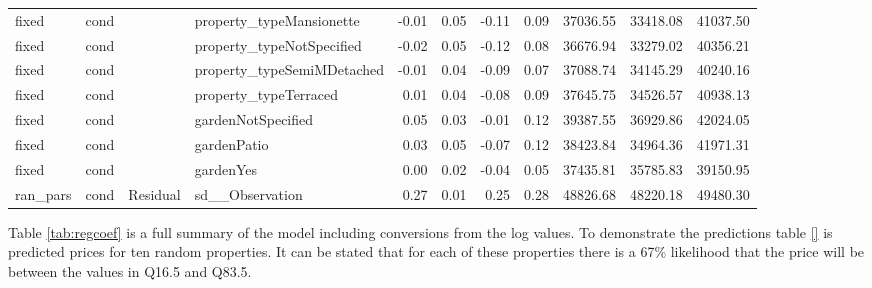 \documentclass{scrartcl}
\begin{document}
\begin{landscape}
\begin{table}[ht]
\begin{adjustbox}{max width=\linewidth}
\begin{tabular}{llllrrrrrrr}
			fixed & cond &  & property\_typeMansionette & -0.01 & 0.05 & -0.11 & 0.09 & 37036.55 & 33418.08 & 41037.50 \\ 
			fixed & cond &  & property\_typeNotSpecified & -0.02 & 0.05 & -0.12 & 0.08 & 36676.94 & 33279.02 & 40356.21 \\ 
			fixed & cond &  & property\_typeSemiMDetached & -0.01 & 0.04 & -0.09 & 0.07 & 37088.74 & 34145.29 & 40240.16 \\ 
			fixed & cond &  & property\_typeTerraced & 0.01 & 0.04 & -0.08 & 0.09 & 37645.75 & 34526.57 & 40938.13 \\ 
			fixed & cond &  & gardenNotSpecified & 0.05 & 0.03 & -0.01 & 0.12 & 39387.55 & 36929.86 & 42024.05 \\ 
			fixed & cond &  & gardenPatio & 0.03 & 0.05 & -0.07 & 0.12 & 38423.84 & 34964.36 & 41971.31 \\ 
			fixed & cond &  & gardenYes & 0.00 & 0.02 & -0.04 & 0.05 & 37435.81 & 35785.83 & 39150.95 \\ 
			ran\_pars & cond & Residual & sd\_\_Observation & 0.27 & 0.01 & 0.25 & 0.28 & 48826.68 & 48220.18 & 49480.30 \\ 
			\hline
		\end{tabular}
	\end{adjustbox}
	\end{table}
\end{landscape}


Table \ref*{tab:regcoef} is a full summary of the model including conversions from the log values. To demonstrate the predictions table \ref{} is predicted prices for ten random properties. It can be stated that for each of these properties there is a 67\% likelihood that the price will be between the values in Q16.5 and Q83.5.
\end{document}
